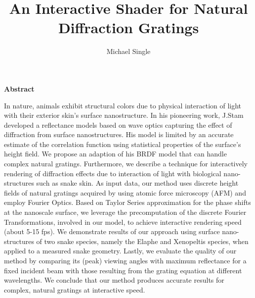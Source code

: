 \documentclass[a4paper]{report}
\begin{document}
\pagestyle{fancyplain} \thispagestyle{empty}

\title{An Interactive Shader for Natural Diffraction Gratings}
\author{Michael Single}

 \setcounter{page}{1}
\maketitle

\newpage
\thispagestyle{empty}
\vspace{8cm}
\noindent
{\centerline {\bf \large Abstract}}
\vspace{1cm}


\noindent
In nature, animals exhibit structural colors due to physical interaction of light with their exterior skin's surface nanostructure. In his pioneering work, J.Stam developed a reflectance models based on wave optics capturing the effect of diffraction from surface nanostructures. His model is limited by an accurate estimate of the correlation function using statistical properties of the surface's height field. We propose an adaption of his BRDF model that can handle complex natural gratings. Furthermore, we describe a technique for interactively rendering of diffraction effects due to interaction of light with biological nano-structures such as snake skin. As input data, our method uses discrete height fields of natural gratings acquired by using atomic force microscopy (AFM) and employ Fourier Optics. Based on Taylor Series approximation for the phase shifts at the nanoscale surface, we leverage the precomputation of the discrete Fourier Transformations, involved in our model, to achieve interactive rendering speed (about 5-15 fps). We demonstrate results of our approach using surface nano-structures of two snake species, namely the Elaphe and Xenopeltis species, when applied to a measured snake geometry. Lastly, we evaluate the quality of our method by comparing its (peak) viewing angles with maximum reflectance for a fixed incident beam with those resulting from the grating equation at different wavelengths. We conclude that our method produces accurate results for complex, natural gratings at interactive speed.

 \setcounter{page}{1}
\tableofcontents

\newpage{\pagestyle{empty} \cleardoublepage}

 \setcounter{page}{1}
\pagestyle{fancy}
\end{document}

